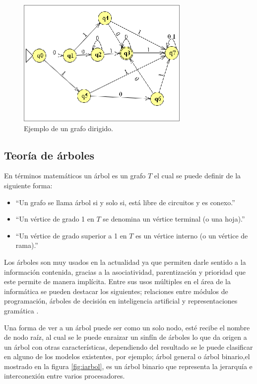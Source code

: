 \begin{figure}[h]
\centering
\includegraphics[width=0.8\columnwidth]{chap3/Imagenes/GrafoDirigido.eps}
\caption{Ejemplo de un grafo dirigido.}
\label{fig:igrafoD}
\end{figure}


\subsection{Teor\'ia de \'arboles}
En t\'erminos matem\'aticos un \'arbol es un grafo $T$ el cual se puede definir
 de la siguiente forma\cite{SUSANNAS.EPP2012}:

\begin{itemize}
	\item ``Un grafo se llama \'arbol si y solo si, est\'a libre de circuitos y
	 es conexo.''
	\item ``Un v\'ertice de grado 1 en $T$ se denomina un v\'ertice terminal (o
	 una hoja).''
	\item ``Un v\'ertice de grado superior a 1 en $T$ es un v\'ertice interno 
	(o un v\'ertice de rama).''
\end{itemize}


Los \'arboles son muy usados en la actualidad ya que permiten  darle sentido a
 la informaci\'on contenida, gracias a la asociatividad, parentizaci\'on y
 prioridad que este permite de manera impl\'icita. Entre sus usos m\'ultiples 
 en el \'area de la inform\'atica se pueden destacar los  siguientes; 
 relaciones entre m\'odulos de programaci\'on, \'arboles de decisi\'on en 
 inteligencia artificial y representaciones gram\'atica
 \cite{gutierrez1999estructuras}.  

Una forma de ver a un \'arbol puede ser como un solo nodo, est\'e recibe el 
 nombre de  nodo ra\'iz, al cual se le puede enraizar un sinf\'in de \'arboles 
 lo que da origen  a un \'arbol con otras caracter\'isticas, dependiendo del 
 resultado se le puede clasificar en alguno de los modelos existentes, por 
 ejemplo; \'arbol  general o \'arbol binario\cite{gutierrez1999estructuras},el 
 mostrado en la figura \ref{fig:iarbol}, es un \'arbol binario que representa 
 la jerarqu\'ia e interconexi\'on entre varios procesadores. 

